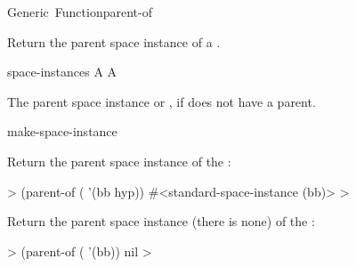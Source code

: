 \documentclass[10pt,twoside,english,pdftex]{article}
\begin{document}
\begin{functiondoc}{Generic~Function}{parent-of}%
  {
    \returns{} }
%

\fnsyntax

\fnpurpose Return the parent space instance of a .

\fnmethods
{}%
  {\code{(} 
    \returns{} }

\fnpackage {}

\fnmodule {}

\fnargs
\begin{args}{space-instances}
 A 
 A 
\end{args}

\fnreturns The parent space instance or \nil, if  does not
have a parent.

\begin{alsos}{make-space-instance}
\also[children-of]
\end{alsos}

\fnexamples {}%
%
Return the parent space instance of the 
:
%
\W\supp
\begin{example}
  > (parent-of ( '(bb hyp))
  #<standard-space-instance (bb)>
  >
\end{example}
%
Return the parent space instance (there is none) of
the  :
%
\W\supp\notpretop
\begin{example}
  > (parent-of ( '(bb))
  nil
  >
\end{example}

\end{functiondoc}

\end{document}
